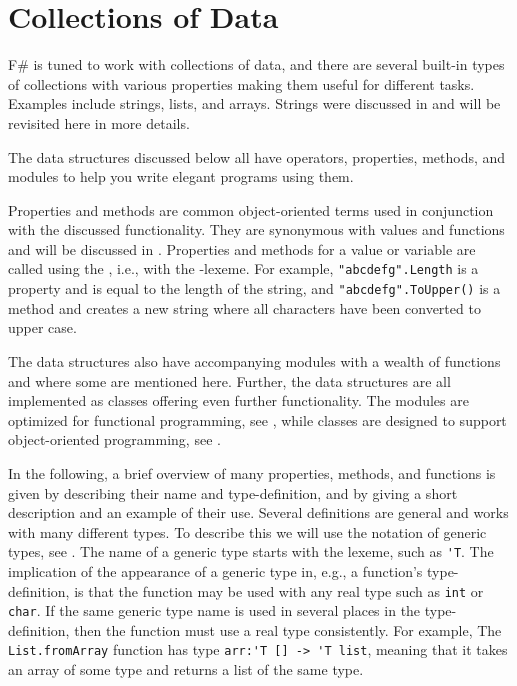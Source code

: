 \documentclass[fsharpnotes.tex]{subfiles}
\begin{document}
\chapter{Collections of Data}
\label{chap:lists}
F\# is tuned to work with collections of data, and there are several built-in types of collections with various properties making them useful for different tasks. Examples include strings, lists, and arrays. Strings were discussed in  and will be revisited here in more details.

The data structures discussed below all have operators, properties, methods, and modules to help you write elegant programs using them.

Properties and methods are common object-oriented terms used in conjunction with the discussed functionality. They are synonymous with values and functions and will be discussed in . Properties and methods for a value or variable are called using the , i.e., with the -lexeme. For example, \lstinline{"abcdefg".Length} is a property and is equal to the length of the string, and \lstinline|"abcdefg".ToUpper()| is a method and creates a new string where all characters have been converted to upper case.

The data structures also have accompanying modules with a wealth of functions and where some are mentioned here. Further, the data structures are all implemented as classes offering even further functionality. The modules are optimized for functional programming, see , while classes are designed to support object-oriented programming, see .

In the following, a brief overview of many properties, methods, and functions is given by describing their name and type-definition, and by giving a short description and an example of their use. Several definitions are general and works with many different types. To describe this we will use the notation of generic types, see . The name of a generic type starts with the  lexeme, such as \lstinline{'T}. The implication of the appearance of a generic type in, e.g., a function's type-definition, is that the function may be used with any real type such as \lstinline{int} or \lstinline{char}. If the same generic type name is used in several places in the type-definition, then the function must use a real type consistently. For example, The \lstinline{List.fromArray} function has type \lstinline{arr:'T [] -> 'T list}, meaning that it takes an array of some type and returns a list of the same type.
\end{document}
